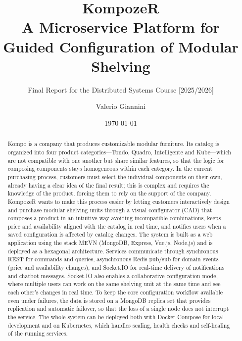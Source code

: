 \documentclass{scrartcl}
\title{\LARGE
    KompozeR\\
    A Microservice Platform for Guided Configuration of Modular Shelving
}
\subtitle{Final Report for the Distributed Systems Course [2025/2026]}
\author{
Valerio Giannini \\ \emailaddr{valerio.giannini@studio.unibo.it}
}
\date{\today}
\begin{document}
\maketitle

\begin{abstract}
    Kompo is a company that produces customizable modular furniture. Its catalog
    is organized into four product categories---Tondo, Quadro, Intelligente and Kube---which
    are not compatible with one another but share similar features, so that the
    logic for composing components stays homogeneous within each category. In the
    current purchasing process, customers must select the individual components
    on their own, already having a clear idea of the final result; this is
    complex and requires the knowledge of the product, forcing them
    to rely on the support of the company.
    KompozeR wants to make this process easier by letting customers interactively design and
    purchase modular shelving units through a visual configurator (CAD) that
    composes a product in an intuitive way avoiding incompatible combinations,
    keeps price and availability aligned with the catalog in real time, and notifies users when a saved
    configuration is affected by catalog changes. The system is built as a web application using the stack MEVN (MongoDB, Express, Vue.js, Node.js) and is deployed as a
    hexagonal architecture.
    Services communicate through synchronous REST for commands and queries, asynchronous
    Redis pub/sub for domain events (price and availability changes), and
    Socket.IO for real-time delivery of notifications and chatbot messages.
    Socket.IO also enables a collaborative configuration mode, where multiple
    users can work on the same shelving unit at the same time and see each
    other's changes in real time. To keep the core configuration workflow
    available even under failures, the data is stored on a MongoDB replica set
    that provides replication and automatic failover, so that the loss of a
    single node does not interrupt the service. The whole system can be
    deployed both with Docker Compose for local development and on Kubernetes,
    which handles scaling, health checks and self-healing of the running
    services.
\end{abstract}




















\end{document}
